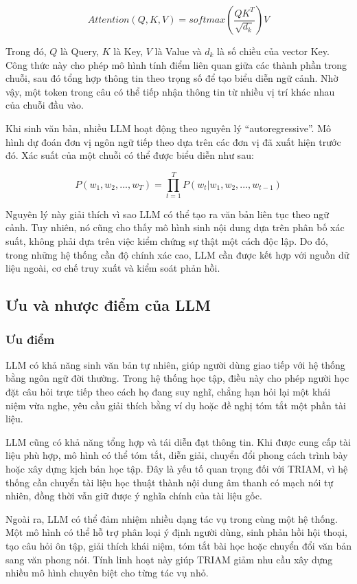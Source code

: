 \documentclass[12pt,a4paper]{report}
\begin{document}
\[
Attention(Q, K, V) = softmax\left(\frac{QK^T}{\sqrt{d_k}}\right)V
\]

Trong đó, \(Q\) là Query, \(K\) là Key, \(V\) là Value và \(d_k\) là số chiều của vector Key. Công thức này cho phép mô hình tính điểm liên quan giữa các thành phần trong chuỗi, sau đó tổng hợp thông tin theo trọng số để tạo biểu diễn ngữ cảnh. Nhờ vậy, một token trong câu có thể tiếp nhận thông tin từ nhiều vị trí khác nhau của chuỗi đầu vào.

Khi sinh văn bản, nhiều LLM hoạt động theo nguyên lý ``autoregressive''. Mô hình dự đoán đơn vị ngôn ngữ tiếp theo dựa trên các đơn vị đã xuất hiện trước đó. Xác suất của một chuỗi có thể được biểu diễn như sau:

\[
P(w_1, w_2, ..., w_T) = \prod_{t=1}^{T} P(w_t | w_1, w_2, ..., w_{t-1})
\]

Nguyên lý này giải thích vì sao LLM có thể tạo ra văn bản liên tục theo ngữ cảnh. Tuy nhiên, nó cũng cho thấy mô hình sinh nội dung dựa trên phân bố xác suất, không phải dựa trên việc kiểm chứng sự thật một cách độc lập. Do đó, trong những hệ thống cần độ chính xác cao, LLM cần được kết hợp với nguồn dữ liệu ngoài, cơ chế truy xuất và kiểm soát phản hồi.

\subsection{Ưu và nhược điểm của LLM}

\subsubsection{Ưu điểm}

LLM có khả năng sinh văn bản tự nhiên, giúp người dùng giao tiếp với hệ thống bằng ngôn ngữ đời thường. Trong hệ thống học tập, điều này cho phép người học đặt câu hỏi trực tiếp theo cách họ đang suy nghĩ, chẳng hạn hỏi lại một khái niệm vừa nghe, yêu cầu giải thích bằng ví dụ hoặc đề nghị tóm tắt một phần tài liệu.

LLM cũng có khả năng tổng hợp và tái diễn đạt thông tin. Khi được cung cấp tài liệu phù hợp, mô hình có thể tóm tắt, diễn giải, chuyển đổi phong cách trình bày hoặc xây dựng kịch bản học tập. Đây là yếu tố quan trọng đối với TRIAM, vì hệ thống cần chuyển tài liệu học thuật thành nội dung âm thanh có mạch nói tự nhiên, đồng thời vẫn giữ được ý nghĩa chính của tài liệu gốc.

Ngoài ra, LLM có thể đảm nhiệm nhiều dạng tác vụ trong cùng một hệ thống. Một mô hình có thể hỗ trợ phân loại ý định người dùng, sinh phản hồi hội thoại, tạo câu hỏi ôn tập, giải thích khái niệm, tóm tắt bài học hoặc chuyển đổi văn bản sang văn phong nói. Tính linh hoạt này giúp TRIAM giảm nhu cầu xây dựng nhiều mô hình chuyên biệt cho từng tác vụ nhỏ.
\end{document}

